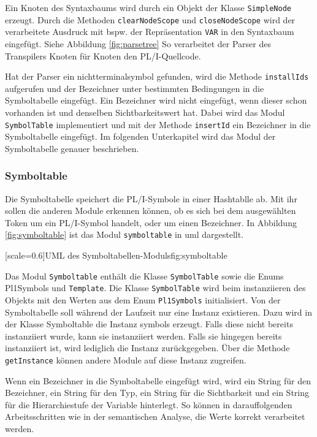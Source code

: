 Ein Knoten des Syntaxbaums wird durch ein Objekt der Klasse \verb+SimpleNode+ erzeugt. Durch die Methoden \verb+clearNodeScope+ und \verb+closeNodeScope+ wird der verarbeitete Ausdruck mit bspw. der Repräsentation \verb+VAR+ in den Syntaxbaum eingefügt. 
Siehe Abbildung \ref{fig:parsetree} So verarbeitet der Parser des Transpilers Knoten für Knoten den PL/I-Quellcode. 

Hat der Parser ein nichtterminalsymbol gefunden, wird die Methode \verb+installIds+ aufgerufen und der Bezeichner unter bestimmten Bedingungen in die Symboltabelle eingefügt. 
Ein Bezeichner wird nicht eingefügt, 
wenn dieser schon vorhanden ist und denselben Sichtbarkeitswert hat. Dabei wird das Modul \verb+SymbolTable+ implementiert und mit der Methode \verb+insertId+ ein Bezeichner in die Symboltabelle eingefügt. Im folgenden Unterkapitel wird das Modul der Symboltabelle genauer beschrieben. 

\subsubsection{Symboltable}
Die Symboltabelle speichert die PL/I-Symbole in einer Hashtablle ab. Mit ihr sollen die anderen Module
erkennen können, ob es sich bei dem ausgewählten Token um ein PL/I-Symbol handelt, oder um einen Bezeichner.
In Abbildung \ref{fig:symboltable} ist das Modul \verb+symboltable+ in \ac{uml} dargestellt.

[scale=0.6]{UML des Symboltabellen-Moduls}{fig:symboltable}

Das Modul \verb+Symboltable+ enthält die Klasse \verb+SymbolTable+
sowie die Enums Pl1Symbols und \verb+Template+. Die Klasse \verb+SymbolTable+ wird beim instanziieren des Objekts mit den Werten aus dem Enum \verb+Pl1Symbols+ initialisiert. Von der Symboltabelle soll während der Laufzeit nur eine Instanz existieren. 
Dazu wird in der Klasse Symboltable die Instanz symbols erzeugt. Falls diese nicht bereits instanziiert wurde, kann sie instanziiert werden. Falls sie hingegen bereits instanziiert ist, wird lediglich die Instanz zurückgegeben.
Über die Methode \verb+getInstance+ können andere Module auf diese Instanz zugreifen.

Wenn ein Bezeichner in die Symboltabelle eingefügt wird, wird ein String für den Bezeichner, ein String für den Typ, ein String für die Sichtbarkeit und ein String für die Hierarchiestufe der Variable hinterlegt. So können in darauffolgenden Arbeitsschritten wie in der semantischen Analyse, die Werte korrekt verarbeitet werden.

